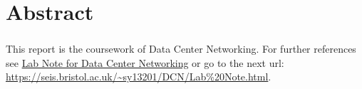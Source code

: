 \chapter*{Abstract} 
\subsection*{\thesistitle}

This report is the coursework of Data Center Networking.
For further references see \href{https://seis.bristol.ac.uk/~sy13201/DCN/Lab\%20Note.html}{Lab Note for Data Center Networking} or go to the next url: \url{https://seis.bristol.ac.uk/~sy13201/DCN/Lab\%20Note.html}.